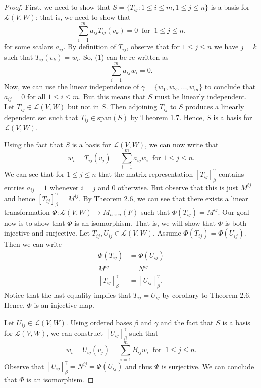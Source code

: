 \begin{proof}
    First, we need to show that \( S = \{ {T}_{ij}: 1 \leq i \leq m, 1 \leq j \leq n  \}  \) is a basis for \( \mathcal{L}(V,W) \); that is, we need to show that
    \[  \sum_{ i=1  }^{ m } {a}_{ij} T_{ij}({v}_{k})= 0 \ \text{ for } \ 1 \leq j \leq n. \tag{1}  \]
    for some scalars \( {a}_{ij}  \). By definition of \( {T}_{ij}  \), observe that for \( 1 \leq j \leq n   \) we have \( j = k  \) such that \( {T}_{ij}({v}_{k }) = {w}_{i} \). So, (1) can be re-written as 
    \[ \sum_{ i=1  }^{ m  } {a}_{ij} {w}_{i} = 0.  \]
    Now, we can use the linear independence of \( \gamma = \{ {w}_{1}, {w}_{2}, \dots, {w}_{m} \}  \) to conclude that \( {a}_{ij} = 0  \) for all \( 1 \leq i \leq m  \). But this means that \( S  \) must be linearly independent. Let \( {T}_{ij} \in \mathcal{L}(V,W)  \) but not in \( S  \). Then adjoining \( {T}_{ij}  \) to \( S  \) produces a linearly dependent set such that \( {T}_{ij} \in \text{span}(S)  \) by Theorem 1.7. Hence, \( S  \) is a basis for \( \mathcal{L}(V,W) \). 

    Using the fact that \( S  \) is a basis for \( \mathcal{L}(V,W) \), we can now write that
    \[  {w}_{i} = {T}_{ij}({v}_{j}) = \sum_{ i=1  }^{ m } {a}_{ij} {w}_{i} \ \text{ for } 1 \leq j \leq n. \tag{2} \] We can see that for \( 1 \leq j \leq n  \) that the matrix representation \( [{T}_{ij}]_{\beta}^{\gamma} \) contains entries \( {a}_{ij} = 1  \) whenever \( i = j  \) and \( 0  \) otherwise. But observe that this is just \( M^{ij} \) and hence \( [{T}_{ij}]_{\beta}^{\gamma} = M^{ij}  \). 
    By Theorem 2.6, we can see that there exists a linear transformation \( \Phi : \mathcal{L}(V,W) \to {M}_{n\times n}(F) \) such that \( \Phi({T}_{ij}) = M^{ij} \). Our goal now is to show that \( \Phi  \) is an isomorphism. That is, we will show that \( \Phi  \) is both injective and surjective. Let \( {T}_{ij}, {U}_{ij} \in \mathcal{L}(V,W)  \). Assume \( \Phi({T}_{ij}) = \Phi({U}_{ij}) \). Then we can write
    \begin{align*}
        \Phi({T}_{ij}) &= \Phi({U}_{ij})   \\
        M^{ij} &= N^{ij} \\
        [{T}_{ij}]_{\beta}^{\gamma} &= [{U}_{ij}]_{\beta}^{\gamma}.
    \end{align*}
    Notice that the last equality implies that \( {T}_{ij} = {U}_{ij} \) by corollary to Theorem 2.6. Hence, \( \Phi  \) is an injective map.

    Let \( {U}_{ij} \in \mathcal{L}(V,W) \). Using ordered bases \( \beta \) and \( \gamma \) and the fact that \( S  \) is a basis for \( \mathcal{L}(V,W) \), we can construct \( [{U}_{ij}]_{\beta}^{\gamma} \) such that
    \[ {w}_{i} = {U}_{ij}({v}_{j}) = \sum_{ i=1  }^{ m } {B}_{ij} {w}_{i} \ \text{ for } \ 1 \leq j \leq n.  \]
    Observe that \(  [{U}_{ij}]_{\beta}^{\gamma} =  N^{ij} = \Phi({U}_{ij})   \) and thus \( \Phi  \) is surjective. We can conclude that \( \Phi  \) is an isomorphism.
\end{proof}

